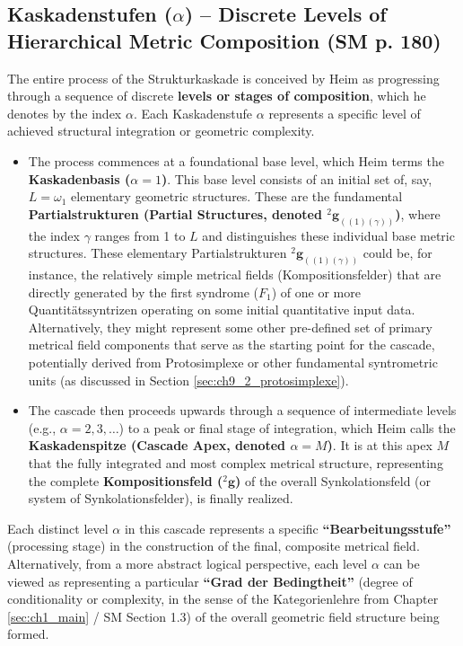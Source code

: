 \documentclass[
    12pt,              %
    a4paper,           %
    headings=normal,   %
    twoside=true,      %
    BCOR=8mm,          %
]{scrbook}
\newcommand{\q}[1]{\enquote{#1}}
\newcommand{\syndrom}{F}
\newcommand{\kompositionsfeld}{{}^2\mathbf{g}}
\newcommand{\partialstruktur}[1]{{}^2\mathbf{g}_{(#1)}}
\newcommand{\kaskadenstufe}{\alpha}
\begin{document}
\subsection{Kaskadenstufen (\(\kaskadenstufe\)) – Discrete Levels of Hierarchical Metric Composition (SM p. 180)}
\label{sec:ch9_1_1_kaskadenstufen}
The entire process of the Strukturkaskade is conceived by Heim as progressing through a sequence of discrete \textbf{levels or stages of composition}, which he denotes by the index \textbf{\(\kaskadenstufe\)}. Each Kaskadenstufe \(\kaskadenstufe\) represents a specific level of achieved structural integration or geometric complexity.
\begin{itemize}
    \item   The process commences at a foundational base level, which Heim terms the \textbf{Kaskadenbasis (\(\kaskadenstufe=1\))}. This base level consists of an initial set of, say, \(L = \omega_1\) elementary geometric structures. These are the fundamental \textbf{Partialstrukturen (Partial Structures, denoted \(\partialstruktur{(1)(\gamma)}\))}, where the index \(\gamma\) ranges from 1 to \(L\) and distinguishes these individual base metric structures. These elementary Partialstrukturen \(\partialstruktur{(1)(\gamma)}\) could be, for instance, the relatively simple metrical fields (Kompositionsfelder) that are directly generated by the first syndrome (\(\syndrom_1\)) of one or more Quantitätssyntrizen operating on some initial quantitative input data. Alternatively, they might represent some other pre-defined set of primary metrical field components that serve as the starting point for the cascade, potentially derived from Protosimplexe or other fundamental syntrometric units (as discussed in Section \ref{sec:ch9_2_protosimplexe}).
    \item   The cascade then proceeds upwards through a sequence of intermediate levels (e.g., \(\kaskadenstufe = 2, 3, \ldots\)) to a peak or final stage of integration, which Heim calls the \textbf{Kaskadenspitze (Cascade Apex, denoted \(\kaskadenstufe=M\))}. It is at this apex \(M\) that the fully integrated and most complex metrical structure, representing the complete \textbf{Kompositionsfeld (\(\kompositionsfeld\))} of the overall Synkolationsfeld (or system of Synkolationsfelder), is finally realized.
\end{itemize}
Each distinct level \(\kaskadenstufe\) in this cascade represents a specific \textbf{\q{Bearbeitungsstufe}} (processing stage) in the construction of the final, composite metrical field. Alternatively, from a more abstract logical perspective, each level \(\kaskadenstufe\) can be viewed as representing a particular \textbf{\q{Grad der Bedingtheit}} (degree of conditionality or complexity, in the sense of the Kategorienlehre from Chapter \ref{sec:ch1_main} / SM Section 1.3) of the overall geometric field structure being formed.
\end{document}
